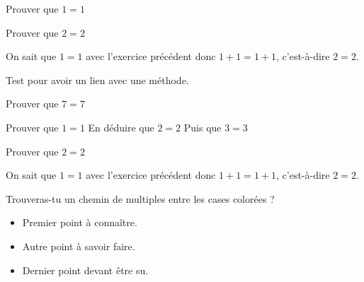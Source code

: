 \documentclass[nocrop]{sesamanuel}
\begin{document}
\exercicesappr
\begin{colonne*exercice}
  \begin{exercice}
  Prouver que $1=1$
  \end{exercice}
  \begin{exercice*}
  Prouver que $2=2$
  \end{exercice*}
  \begin{corrige}
  On sait que $1=1$ avec l’exercice précédent donc $1+1=1+1$,
  c’est-à-dire $2=2$.
  \end{corrige}
  \begin{exercice}
  \label{exo-exemple2}
  Test pour avoir un lien avec une méthode.
  \end{exercice}
  \begin{exercice}
    Prouver que $7=7$
  \end{exercice}

  \begin{exercice}
    \partie
    Prouver que $1=1$
    \partie
    En déduire que $2=2$
    \partie 
    Puis que $3=3$
  \end{exercice}
  \begin{exercice*}
  Prouver que $2=2$
  \end{exercice*}
  \begin{corrige}
  On sait que $1=1$ avec l’exercice précédent donc $1+1=1+1$,
  c’est-à-dire $2=2$.
  \end{corrige}
\end{colonne*exercice}


\recreation
\begin{enigme}
  Trouveras-tu un chemin de multiples entre les cases colorées ?
  \par
  \LabyNombre[Multiple=7,Longueur=12,Largeur=8,XDepart=2,YDepart=2,XArrivee=11,YArrivee=6,Murs]
\end{enigme}


\connaissances
\begin{acquis}
\begin{itemize}
\item Premier point à connaître.
\item Autre point à savoir faire.
\item Dernier point devant être su.
\end{itemize}
\end{acquis}
\end{document}
